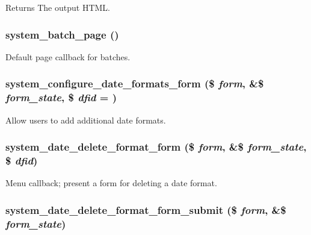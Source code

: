 \begin{DoxyReturn}{Returns}
The output HTML. 
\end{DoxyReturn}
\hypertarget{system_8admin_8inc_a99e35456b673876eff78a38e53673068}{
\subsubsection[{system\_\-batch\_\-page}]{\setlength{\rightskip}{0pt plus 5cm}system\_\-batch\_\-page ()}}
\label{system_8admin_8inc_a99e35456b673876eff78a38e53673068}
Default page callback for batches. \hypertarget{system_8admin_8inc_ac48dbb97434713ff9953f3338fe5dbb0}{
\subsubsection[{system\_\-configure\_\-date\_\-formats\_\-form}]{\setlength{\rightskip}{0pt plus 5cm}system\_\-configure\_\-date\_\-formats\_\-form (\$ {\em form}, \/  \&\$ {\em form\_\-state}, \/  \$ {\em dfid} = {})}}
\label{system_8admin_8inc_ac48dbb97434713ff9953f3338fe5dbb0}
Allow users to add additional date formats. \hypertarget{system_8admin_8inc_a336db528b424fdd470e363fe80b77fa1}{
\subsubsection[{system\_\-date\_\-delete\_\-format\_\-form}]{\setlength{\rightskip}{0pt plus 5cm}system\_\-date\_\-delete\_\-format\_\-form (\$ {\em form}, \/  \&\$ {\em form\_\-state}, \/  \$ {\em dfid})}}
\label{system_8admin_8inc_a336db528b424fdd470e363fe80b77fa1}
Menu callback; present a form for deleting a date format. \hypertarget{system_8admin_8inc_a8eb5f9af75f1ac4f9b96a305f032c29e}{
\subsubsection[{system\_\-date\_\-delete\_\-format\_\-form\_\-submit}]{\setlength{\rightskip}{0pt plus 5cm}system\_\-date\_\-delete\_\-format\_\-form\_\-submit (\$ {\em form}, \/  \&\$ {\em form\_\-state})}}
